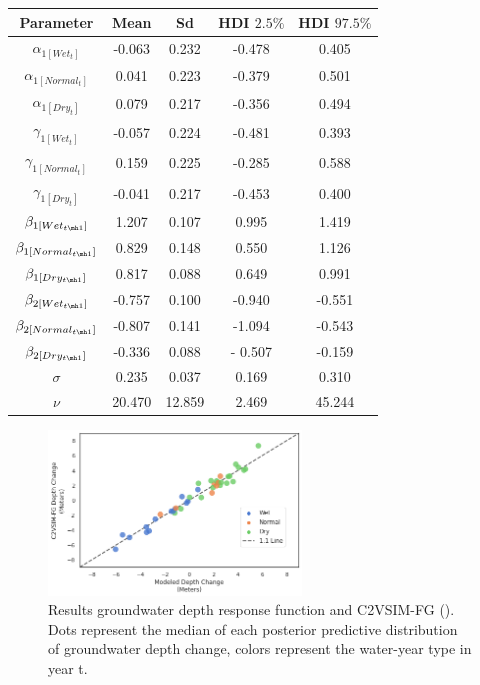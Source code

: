 \documentclass[11pt,a4paper]{article}
\begin{document}
\begin{center}
\begin{tabular}{ |c|c|c|c|c| }
 \hline
 Parameter & Mean & Sd & HDI $2.5\%$ & HDI $97.5\%$ \\ 
 \hline
$\alpha_{1[Wet_{t}]}$ & 	-0.063 &	0.232 &	-0.478 &	0.405 		 \\
$\alpha_{1[Normal_{t}]}$ & 0.041 &	0.223 &	-0.379 &	0.501 	 \\
$\alpha_{1[Dry_{t}]}$ & 	 0.079 &	0.217 &	-0.356 &	0.494	 \\
$\gamma_{1[Wet_{t}]}$ & 	-0.057 	& 0.224 &	-0.481 &	0.393 	 \\
$\gamma_{1[Normal_{t}]}$ & 0.159 &	0.225 &	-0.285 &	0.588 \\
$\gamma_{1[Dry_{t}]}$ & -0.041 &	0.217 &	-0.453 &	0.400 	 \\
$\beta_{1[Wet_{t \mh 1}]}$ & 1.207 &	0.107 &	0.995 &	1.419 	 \\
$\beta_{1[Normal_{t \mh 1}]}$ 	& 0.829 &	0.148 &	0.550 &	1.126	\\
$\beta_{1[Dry_{t \mh 1}]}$ & 0.817 &	0.088 &	0.649 &	0.991 \\
$\beta_{2[Wet_{t \mh 1}]}$ & -0.757 	& 0.100 & -0.940 & 	-0.551 	 \\
$\beta_{2[Normal_{t \mh 1}]}$ & -0.807 &	0.141 &	-1.094 & -0.543 	\\
$\beta_{2[Dry_{t \mh 1}]}$ & -0.336 	& 0.088 & 	- 0.507 &  -0.159 \\
$\sigma$ & 0.235 & 	0.037 & 0.169 & 	0.310 \\
$\nu$ 	& 20.470 & 	12.859 & 2.469 &  	45.244 \\
\hline
\end{tabular}
\end{center}

\begin{figure}[H]
    \centering
    \includegraphics[width=0.6\textwidth]{results_gw_depth_response_calib.png}
    \caption{Results groundwater depth response function and C2VSIM-FG (\cite{dwr_c2vsimfg_2021}). Dots represent the median of each posterior predictive distribution of groundwater depth change, colors represent the water-year type in year t.}
    \label{fig:mesh1}
\end{figure}









\newpage
\printbibliography
\end{document}

